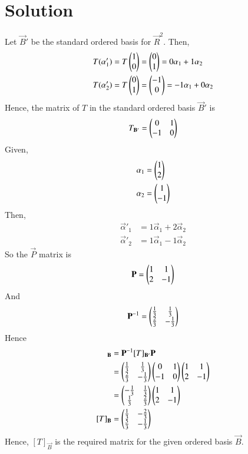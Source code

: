 \documentclass[journal,12pt,twocolumn]{IEEEtran}
\begin{document}
	\section{Solution}
	Let $\vec{B}'$ be the standard ordered basis for $\vec{R}^2$. Then,
	\begin{align}
		T(\mathbf{\alpha}'_1) &= T\begin{pmatrix}1 \\ 0\end{pmatrix} = \begin{pmatrix}0\\1\end{pmatrix} = 0\mathbf{\alpha}_1 + 1\mathbf{\alpha}_2\\
		T(\mathbf{\alpha}'_2) &= T\begin{pmatrix}0 \\ 1\end{pmatrix} = \begin{pmatrix}-1\\0\end{pmatrix} = -1\mathbf{\alpha}_1 + 0\mathbf{\alpha}_2
	\end{align}
Hence, the matrix of $T$ in the standard ordered basis $\vec{B}'$ is
\begin{align}
	T_\mathbf{B'} = \begin{pmatrix}0 & 1\\ -1 & 0\end{pmatrix}
\end{align}
Given, 
\begin{align}
	\mathbf{\alpha}_1 &= \begin{pmatrix}1\\ 2\end{pmatrix} \\ 
	\mathbf{\alpha}_2 &= \begin{pmatrix}1 \\ -1\end{pmatrix} 
\end{align}
Then,
\begin{align}
	\vec{\alpha}'_1 &= 1\vec{\alpha}_1 + 2\vec{ \alpha }_2\\
	\vec{\alpha}'_2 &= 1\vec{\alpha}_1 - 1\vec{ \alpha }_2
\end{align}		
So the $\vec{P}$ matrix is
\begin{align}
	\mathbf{P} = \begin{pmatrix}1 & 1\\ 2 & -1\end{pmatrix}
\end{align}	
And
\begin{align}
	\mathbf{P}^{-1} = \begin{pmatrix}\frac{1}{3} & \frac{1}{3} \\ \frac{2}{3} & -\frac{1}{3}\end{pmatrix}
\end{align}
Hence
\begin{align}
	[T]_\vec{B} &= \vec{P}^{-1} [T]_\vec{B'} \vec{P}\\
	&= \myvec{\frac{1}{3} & \frac{1}{3} \\ \frac{2}{3} & -\frac{1}{3}}\myvec{0 & 1\\ -1 & 0}\myvec{1 & 1\\ 2 & -1}\\
	&= \myvec{-\frac{1}{3} & \frac{1}{3} \\ \frac{1}{3} & \frac{2}{3}}\myvec{1 & 1\\ 2 & -1}\\
	[T]_\vec{B} &= \myvec{\frac{1}{3} & -\frac{2}{3} \\ \frac{5}{3} & -\frac{1}{3}}
\end{align}	
Hence, $[T]_\vec{B}$ is the required matrix for the given ordered basis $\vec{B}$.
\end{document}
